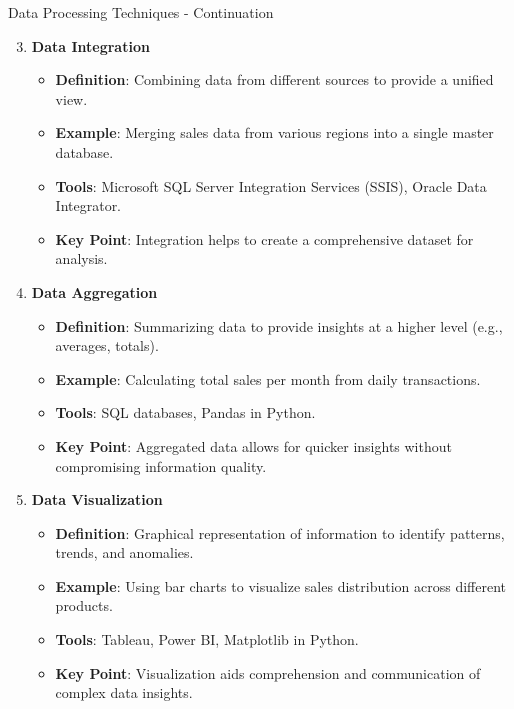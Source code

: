 \documentclass[aspectratio=169]{beamer}
\begin{document}
\begin{frame}[fragile]{Data Processing Techniques - Continuation}
    \begin{enumerate}
        \setcounter{enumi}{2} %
        \item \textbf{Data Integration}
        \begin{itemize}
            \item \textbf{Definition}: Combining data from different sources to provide a unified view.
            \item \textbf{Example}: Merging sales data from various regions into a single master database.
            \item \textbf{Tools}: Microsoft SQL Server Integration Services (SSIS), Oracle Data Integrator.
            \item \textbf{Key Point}: Integration helps to create a comprehensive dataset for analysis.
        \end{itemize}

        \item \textbf{Data Aggregation}
        \begin{itemize}
            \item \textbf{Definition}: Summarizing data to provide insights at a higher level (e.g., averages, totals).
            \item \textbf{Example}: Calculating total sales per month from daily transactions.
            \item \textbf{Tools}: SQL databases, Pandas in Python.
            \item \textbf{Key Point}: Aggregated data allows for quicker insights without compromising information quality.
        \end{itemize}

        \item \textbf{Data Visualization}
        \begin{itemize}
            \item \textbf{Definition}: Graphical representation of information to identify patterns, trends, and anomalies.
            \item \textbf{Example}: Using bar charts to visualize sales distribution across different products.
            \item \textbf{Tools}: Tableau, Power BI, Matplotlib in Python.
            \item \textbf{Key Point}: Visualization aids comprehension and communication of complex data insights.
        \end{itemize}
    \end{enumerate}
\end{frame}
\end{document}
